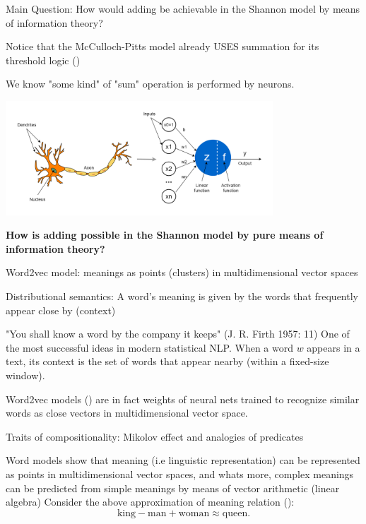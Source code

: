 \documentclass[10pt, aspectratio=169, handout]{beamer}
\begin{document}
\begin{frame}{Main Question: How would adding be achievable in the Shannon model by means of information theory?}


    Notice that the McCulloch-Pitts  model already USES summation for its threshold logic (\cite{mcculloch_logical_1943})
   
     We know "some kind" of "sum" operation is performed by neurons.
     
     \includegraphics[width=10cm]{images/latexImage_63d4c13d6261c28a5b1ff9f3f41e4f0d.png}

  \textbf{ How is adding possible in the Shannon model by pure means of information theory?}
    
\end{frame}
 




\begin{frame}{Word2vec model: meanings as points (clusters) in multidimensional vector spaces}
    

    Distributional semantics: A word's meaning is given by the words that frequently appear close by (context)

    "You shall know a word by the company it keeps" (J. R. Firth 1957: 11)
    One of the most successful ideas in modern statistical NLP.
    When a word $w$ appears in a text, its context is the set of words that appear nearby (within a fixed-size window).

    Word2vec models (\cite{mikolov2013a}) are in fact weights of neural nets trained to recognize similar words as close vectors in multidimensional vector space.


\end{frame}

\begin{frame}{Traits of compositionality:  Mikolov effect and  analogies of predicates}

   Word models show that meaning (i.e linguistic representation) can be represented as points in multidimensional vector spaces, and whats more, complex meanings can be predicted from simple meanings by means of vector arithmetic (linear algebra)
    Consider the above approximation of meaning relation (\cite{mikolov2013a}):
   \huge $$\text{king} - \text{man} + \text{woman} \approx \text{queen}.$$

\end{frame}
\end{document}
